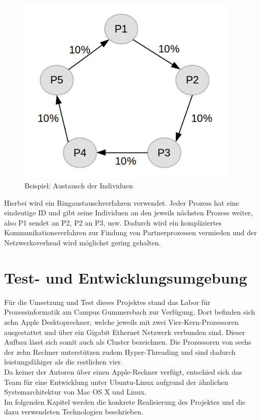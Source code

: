 \documentclass[12pt,a4paper]{scrreprt}
\newcommand{\absatz}{\\[12pt]}
\begin{document}
\begin{figure}[ht]
  	\centering
	\includegraphics[width=300pt]{images/algo_06_exchange.png}
	\caption{Beispiel: Austausch der Individuen}
	\label{fig:algo-sample-exchange}
\end{figure}

Hierbei wird ein Ringaustauschverfahren verwendet. Jeder Prozess hat eine eindeutige ID und gibt seine Individuen an den jeweils nächsten Prozess weiter, also P1 sendet an P2, P2 an P3, usw. Dadurch wird ein kompliziertes Kommunikationsverfahren zur Findung von Partnerprozessen vermieden und der Netzwerkoverhead wird möglichst gering gehalten.

\chapter{Test- und Entwicklungsumgebung}
\label{chap:testumgebung}

Für die Umsetzung und Test dieses Projektes stand das Labor für Prozessinformatik am Campus Gummersbach zur Verfügung. Dort befinden sich zehn Apple Desktoprechner, welche jeweils mit zwei Vier-Kern-Prozessoren ausgestattet und über ein Gigabit Ethernet Netzwerk verbunden sind. Dieser Aufbau lässt sich somit auch als Cluster bezeichnen. Die Prozessoren von sechs der zehn Rechner unterstützen zudem Hyper-Threading und sind dadurch leistungsfähiger als die restlichen vier.\absatz
Da keiner der Autoren über einen Apple-Rechner verfügt, entschied sich das Team für eine Entwicklung unter Ubuntu-Linux aufgrund der ähnlichen Systemarchitektur von Mac OS X und Linux.\\
Im folgenden Kapitel werden die konkrete Realisierung des Projektes und die dazu verwendeten Technologien beschrieben.
\end{document}
